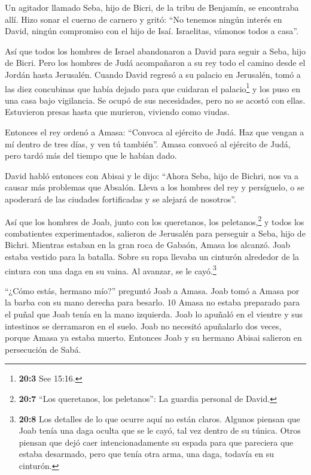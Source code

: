  Un agitador llamado Seba, hijo de Bicri, de la tribu de
Benjamín, se encontraba allí. Hizo sonar el cuerno de carnero y gritó:
``No tenemos ningún interés en David, ningún compromiso con el hijo de
Isaí. Israelitas, vámonos todos a casa''.

 Así que todos los hombres de Israel abandonaron a David
para seguir a Seba, hijo de Bicri. Pero los hombres de Judá acompañaron
a su rey todo el camino desde el Jordán hasta Jerusalén. 
Cuando David regresó a su palacio en Jerusalén, tomó a las diez
concubinas que había dejado para que cuidaran el palacio\footnote{\textbf{20:3}
  See 15:16.} y los puso en una casa bajo vigilancia. Se ocupó de sus
necesidades, pero no se acostó con ellas. Estuvieron presas hasta que
murieron, viviendo como viudas.

 Entonces el rey ordenó a Amasa: ``Convoca al ejército de
Judá. Haz que vengan a mí dentro de tres días, y ven tú también''.
 Amasa convocó al ejército de Judá, pero tardó más del
tiempo que le habían dado.

 David habló entonces con Abisai y le dijo: ``Ahora Seba,
hijo de Bichri, nos va a causar más problemas que Absalón. Lleva a los
hombres del rey y persíguelo, o se apoderará de las ciudades
fortificadas y se alejará de nosotros''.

 Así que los hombres de Joab, junto con los queretanos, los
peletanos,\footnote{\textbf{20:7} ``Los queretanos, los peletanos'': La
  guardia personal de David.} y todos los combatientes experimentados,
salieron de Jerusalén para perseguir a Seba, hijo de Bichri.
 Mientras estaban en la gran roca de Gabaón, Amasa los
alcanzó. Joab estaba vestido para la batalla. Sobre su ropa llevaba un
cinturón alrededor de la cintura con una daga en su vaina. Al avanzar,
se le cayó.\footnote{\textbf{20:8} Los detalles de lo que ocurre aquí no
  están claros. Algunos piensan que Joab tenía una daga oculta que se le
  cayó, tal vez dentro de su túnica. Otros piensan que dejó caer
  intencionadamente su espada para que pareciera que estaba desarmado,
  pero que tenía otra arma, una daga, todavía en su cinturón.}

 ``¿Cómo estás, hermano mío?'' preguntó Joab a Amasa. Joab
tomó a Amasa por la barba con su mano derecha para besarlo. 10 Amasa no
estaba preparado para el puñal que Joab tenía en la mano izquierda. Joab
lo apuñaló en el vientre y sus intestinos se derramaron en el suelo.
Joab no necesitó apuñalarlo dos veces, porque Amasa ya estaba muerto.
Entonces Joab y su hermano Abisai salieron en persecución de Sabá.

